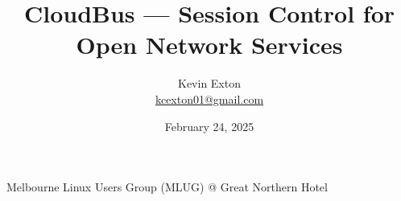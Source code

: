 \title{CloudBus --- Session Control for Open Network Services}
\author[K. Exton]{
	\centering
	Kevin Exton\\
	\href{mailto:kcexton01@gmail.com}{\footnotesize kcexton01@gmail.com}
}
\date{February 24, 2025}
\begin{frame}[plain]
	\titlepage
	\centering
	\footnotesize Melbourne Linux Users Group (MLUG) @ Great Northern Hotel
\end{frame}